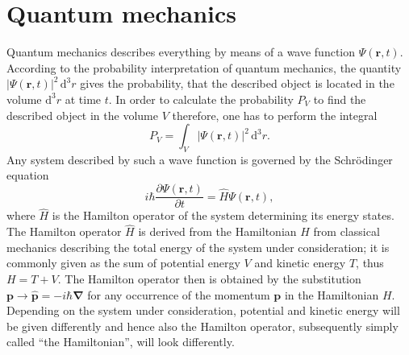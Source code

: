 \documentclass{report}
\numberwithin{tm}{section}
\newcommand\vect[1]{\ensuremath{\bm{#1}}}
\begin{document}
%	

	
	\chapter{Quantum mechanics}
	Quantum mechanics describes everything by means of a wave function $\Psi(\vect{r},t)$. According to the probability interpretation of quantum mechanics, the quantity $|\Psi(\vect{r},t)|^2\,\mathrm{d}^3r$ gives the probability, that the described object is located in the volume $\mathrm{d}^3r$ at time $t$. In order to calculate the probability $P_V$ to find the described object in the volume $V$ therefore, one has to perform the integral \begin{equation}
		P_V = \int_{V} |\Psi(\vect{r},t)|^2\,\mathrm{d}^3r.
	\end{equation} Any system described by such a wave function is governed by the Schrödinger equation 
	\begin{equation}
		i\hbar \frac{\partial \Psi(\vect{r},t)}{\partial t} = \hat{H}\Psi(\vect{r},t),
	\end{equation}
	where $\hat{H}$ is the Hamilton operator of the system determining its energy states. The Hamilton operator $\hat{H}$ is derived from the Hamiltonian $H$ from classical mechanics describing the total energy of the system under consideration; it is commonly given as the sum of potential energy $V$ and kinetic energy $T$, thus $H = T + V$. The Hamilton operator then is obtained by the substitution $\vect{p} \rightarrow \hat{\vect{p}} = -i\hbar \vect{\nabla}$ for any occurrence of the momentum $\vect{p}$ in the Hamiltonian $H$. Depending on the system under consideration, potential and kinetic energy will be given differently and hence also the Hamilton operator, subsequently simply called ``the Hamiltonian'', will look differently.
	
\end{document}
